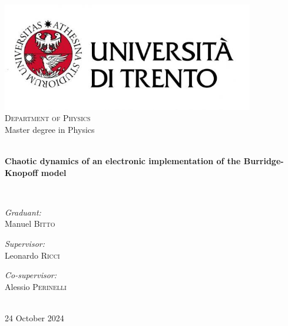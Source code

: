 \begin{titlepage}
    \begin{center}
    
    \includegraphics[width=11cm]{images/Logo Unitn.jpg}\\[1cm]
    
    \textsc{\Large Department of Physics}\\[1.5cm]
    
    {\Large Master degree in Physics}\\[1.5cm]
    
    \hrulefill \\[0.4cm]
    {\huge \bfseries Chaotic dynamics of an electronic implementation of the Burridge-Knopoff model\par}\vspace{0.4cm}
    \hrulefill \\[1.5cm]
    
    \begin{minipage}[t]{0.4\textwidth}
    \begin{flushleft} \large
    \emph{Graduant:}\\
    {Manuel \textsc{Bitto}}
    \end{flushleft}
    \end{minipage}
    \begin{minipage}[t]{0.4\textwidth}
    \begin{flushright} \large
    \emph{Supervisor:} \\
    {Leonardo \textsc{Ricci}}
    \end{flushright}
    \begin{flushright}
    \emph{Co-supervisor:}\\
    {Alessio \textsc{Perinelli}}
    \end{flushright}
    \end{minipage}\\[3cm]
    
    \vfill
    {\Large 24 October 2024}
    
    \end{center}
    \end{titlepage}